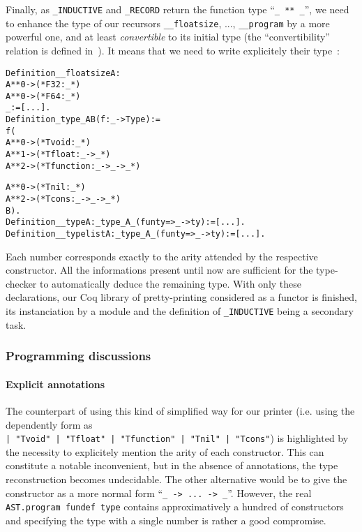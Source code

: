 \documentclass[a4paper, 11pt]{article}
\newenvironment{coq}
  {%
   \begin{alltt}} %% 8.3pl1 (January 2011)
  {\end{alltt} %
  }
\begin{document}
Finally, as \verb|_INDUCTIVE| and \verb|_RECORD| return the function type ``\verb|_ ** _|'', we need to enhance the type of our recursors \verb|__floatsize|, ..., \verb|__program| by a more powerful one, and at least \emph{convertible} to its initial type (the ``convertibility'' relation is defined in~\cite{Coq:manual}). It means that we need to write explicitely their type~:
\begin{coq}
Definition __floatsize {A} : 
    A ** 0 ->                (* F32       :           _ *)
    A ** 0 ->                (* F64       :           _ *)
    _ := [...].
Definition _type_ A B (f : _ -> Type) := 
  f (
    A ** 0 ->                (* Tvoid     :           _ *)
    A ** 1 ->                (* Tfloat    : _ ->      _ *)
    A ** 2 ->                (* Tfunction : _ -> _ -> _ *)

    A ** 0 ->                (* Tnil      :           _ *)
    A ** 2 ->                (* Tcons     : _ -> _ -> _ *)
  B).
Definition __type {A} : _type_ A _ (fun ty => _ -> ty) := [...].
Definition __typelist {A} : _type_ A _ (fun ty => _ -> ty) := [...].
\end{coq}
Each number corresponds exactly to the arity attended by the respective constructor.
All the informations present until now are sufficient for the type-checker to automatically deduce the remaining type. With only these declarations, our Coq library of pretty-printing considered as a functor is finished, its instanciation by a module and the definition of \verb|_INDUCTIVE| being a secondary task.
\subsubsection{Programming discussions}
\paragraph{Explicit annotations}
The counterpart of using this kind of simplified way for our printer (i.e. using the dependently form as \\ 
\verb_| "Tvoid" | "Tfloat" | "Tfunction" | "Tnil" | "Tcons"_) is highlighted by the necessity to explicitely mention the arity of each constructor. This can constitute a notable inconvenient, but in the absence of annotations, the type reconstruction becomes undecidable.
The other alternative would be to give the constructor as a more normal form ``\verb|_ -> ... -> _|''. However, the real \verb|AST.program fundef type| contains approximatively a hundred of constructors and specifying the type with a single number is rather a good compromise.
\end{document}
